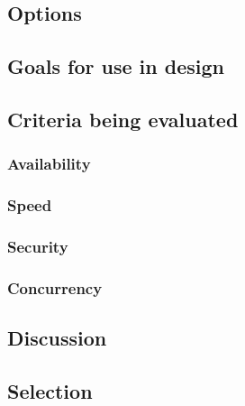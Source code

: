 \documentclass[10pt,letterpaper,onecolumn,draftclsnofoot]{IEEEtran}
\begin{document}
\subsection{Options}

\subsubsection{}

\subsubsection{}

\subsubsection{}

\subsection{Goals for use in design}

\subsection{Criteria being evaluated}

\subsubsection{Availability}

\subsubsection{Speed}

\subsubsection{Security}

\subsubsection{Concurrency}

\subsection{Discussion}

\subsection{Selection}
\end{document}
